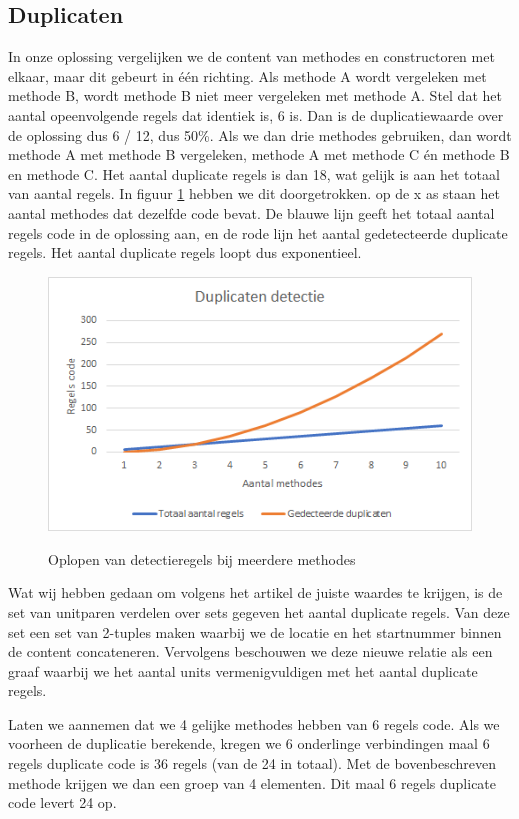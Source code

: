 \documentclass[a4paper]{article}
\begin{document}
\subsection{Duplicaten}
In onze oplossing vergelijken we de content van methodes en constructoren met elkaar, maar dit gebeurt in één richting. Als methode A wordt vergeleken met methode B, wordt methode B niet meer vergeleken met methode A. Stel dat het aantal opeenvolgende regels dat identiek is, 6 is. Dan is de duplicatiewaarde over de oplossing dus 6 / 12, dus 50\%. Als we dan drie methodes gebruiken, dan wordt methode A met methode B vergeleken, methode A met methode C én methode B en methode C. Het aantal duplicate regels is dan 18, wat gelijk is aan het totaal van aantal regels. In figuur \ref{fig:DuplicatenDetectie} hebben we dit doorgetrokken. op de x as staan het aantal methodes dat dezelfde code bevat. De blauwe lijn geeft het totaal aantal regels code in de oplossing aan, en de rode lijn het aantal gedetecteerde duplicate regels. Het aantal duplicate regels loopt dus exponentieel.
\begin{figure}[htbp]
\caption{Oplopen van detectieregels bij meerdere methodes}
\centering
\includegraphics[width=0.8 \textwidth]{DuplicatenDetectie.png}
\label{fig:DuplicatenDetectie}
\end{figure}

Wat wij hebben gedaan om volgens het artikel de juiste waardes te krijgen,  is de set van unitparen verdelen over sets gegeven het aantal duplicate regels. Van deze set een set van 2-tuples maken waarbij we de locatie en het startnummer binnen de content concateneren. Vervolgens beschouwen we deze nieuwe relatie als een graaf waarbij we het aantal units vermenigvuldigen met het aantal duplicate regels.

Laten we aannemen dat we 4 gelijke methodes hebben van 6 regels code. Als we voorheen de duplicatie berekende, kregen we 6 onderlinge verbindingen maal 6 regels duplicate code is 36 regels (van de 24 in totaal). Met de bovenbeschreven methode krijgen we dan een groep van 4 elementen. Dit maal 6 regels duplicate code levert 24 op.
\end{document}
